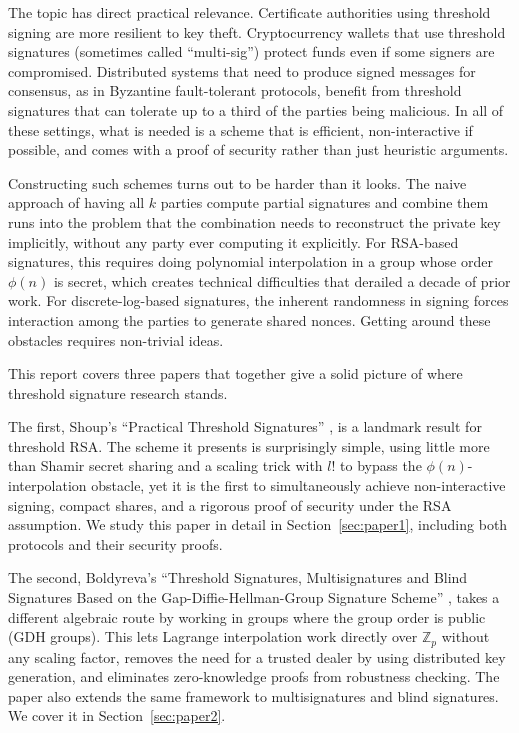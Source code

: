 \vspace{0.2cm}
\noindent
The topic has direct practical relevance. Certificate authorities using threshold signing
are more resilient to key theft. Cryptocurrency wallets that use threshold signatures
(sometimes called ``multi-sig'') protect funds even if some signers are compromised.
Distributed systems that need to produce signed messages for consensus, as in Byzantine
fault-tolerant protocols, benefit from threshold signatures that can tolerate up to a
third of the parties being malicious. In all of these settings, what is needed is a
scheme that is efficient, non-interactive if possible, and comes with a proof of security
rather than just heuristic arguments.

Constructing such schemes turns out to be harder than it looks. The naive approach of
having all $k$ parties compute partial signatures and combine them runs into the problem
that the combination needs to reconstruct the private key implicitly, without any party
ever computing it explicitly. For RSA-based signatures, this requires doing polynomial
interpolation in a group whose order $\phi(n)$ is secret, which creates technical
difficulties that derailed a decade of prior work. For discrete-log-based signatures, the
inherent randomness in signing forces interaction among the parties to generate shared
nonces. Getting around these obstacles requires non-trivial ideas.

This report covers three papers that together give a solid picture of where threshold
signature research stands.

The first, Shoup's ``Practical Threshold Signatures'' \cite{Shoup00}, is a landmark
result for threshold RSA. The scheme it presents is surprisingly simple, using little more than Shamir secret
sharing and a scaling trick with $l!$ to bypass the $\phi(n)$-interpolation obstacle,
yet it is the first to simultaneously achieve non-interactive signing, compact shares,
and a rigorous proof of security under the RSA assumption. We study this paper in detail in Section~\ref{sec:paper1}, including both
protocols and their security proofs.

The second, Boldyreva's ``Threshold Signatures, Multisignatures and Blind Signatures
Based on the Gap-Diffie-Hellman-Group Signature Scheme'' \cite{Bold03}, takes a
different algebraic route by working in groups where the group order is public (GDH
groups). This lets Lagrange interpolation work directly over $\mathbb{Z}_p$ without any
scaling factor, removes the need for a trusted dealer by using distributed key
generation, and eliminates zero-knowledge proofs from robustness checking. The paper
also extends the same framework to multisignatures and blind signatures. We cover it in
Section~\ref{sec:paper2}.

